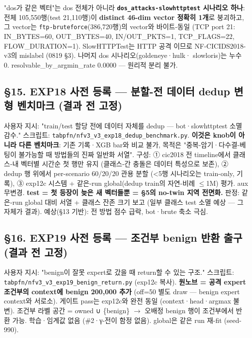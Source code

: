 "dos가 같은 벡터"는 dos 전체가 아니라 \textbf{\texttt{dos\_\allowbreak{}\allowbreak{}atta\allowbreak{}cks-\allowbreak{}slow\allowbreak{}httptest\allowbreak{}} 시나리오 하나}: 전체 105,550행(test 21,110행)이 \textbf{distinct 46-dim vector 정확히 1개}로 붕괴하고, 그 vector는 \texttt{ftp-\allowbreak{}brut\allowbreak{}eforce}(386,720행)의 vector와 바이트-동일 (TCP port 21: IN\_\allowbreak{}BYTES=\allowbreak{}60, OUT\_\allowbreak{}BYTES=\allowbreak{}40, IN/\allowbreak{}OUT\_\allowbreak{}PKTS=\allowbreak{}1, TCP\_\allowbreak{}FLAGS=\allowbreak{}22, FLOW\_\allowbreak{}DURATION=\allowbreak{}1). SlowHTTPTest는 HTTP 공격 이므로 NF-CICIDS2018-v3의 mislabel (0819 §3). 나머지 dos 시나리오(goldeneye·hulk· slowloris)는 누수 0. resolvable\_\allowbreak{}by\_\allowbreak{}argmin\_\allowbreak{}rate 0.0000 — 원리적 분리 불가.

\subsection{§15. EXP18 사전 등록 — 분할-전 데이터 dedup 변형 벤치마크 (결과 전 고정)}
사용자 지시: "train/\allowbreak{}test 할당 전에 데이터 자체를 dedup — bot·slowhttptest 소멸 감수." 스크립트: \texttt{tabpfn/\allowbreak{}\allowbreak{}n\allowbreak{}fv3\_\allowbreak{}\allowbreak{}v3\_\allowbreak{}\allowbreak{}e\allowbreak{}xp18\_\allowbreak{}\allowbreak{}ded\allowbreak{}up\_\allowbreak{}\allowbreak{}bench\allowbreak{}mark.\allowbreak{}py}. \textbf{이것은 knob이 아니라 다른 벤치마크}: 기존 기록·XGB bar와 비교 불가, 목적은 "중복-암기·다수결-베팅이 불가능할 때 방법들의 진짜 일반화 서열". 구성: ① cic2018 전 timeline에서 클래스-내 벡터별 시간순 첫 행만 유지 (클래스-간 충돌은 데이터 특성으로 보존), ② dedup 행 위에서 per-scenario 60/\allowbreak{}20/\allowbreak{}20 관용 분할 (<5행 시나리오는 train-only, 기록), ③ exp12c 시스템 +\allowbreak{} 같은-run global(dedup train의 자연-비례 \ensuremath{\leq}1M) 평가. aux 무변경. \textbf{test =\allowbreak{} 첫 등장이 늦은 새 벡터들뿐 =\allowbreak{} §5의 no-twin 지역 전면화.} 판정: 같은-run global 대비 서열 +\allowbreak{} 클래스 잔존 크기 보고 (일부 클래스 test 소멸 예상 — 그 자체가 결과). 예상(§13 기반): 전 방법 점수 급락, bot·brute 축소 극심.

\subsection{§16. EXP19 사전 등록 — 조건부 benign 반환 출구 (결과 전 고정)}
사용자 지시: "benign이 잘못 expert로 갔을 때 return할 수 있는 구조." 스크립트: \texttt{tabpfn/\allowbreak{}\allowbreak{}n\allowbreak{}fv3\_\allowbreak{}\allowbreak{}v3\_\allowbreak{}\allowbreak{}e\allowbreak{}xp19\_\allowbreak{}\allowbreak{}ben\allowbreak{}ign\_\allowbreak{}\allowbreak{}retu\allowbreak{}rn.\allowbreak{}py} (exp12c 복사). \textbf{원노브 =\allowbreak{} 공격 expert 조건부의 context에 benign 200,000 추가} (off=\allowbreak{}50 별도 draw — benign expert context와 서로소). 게이트 pass는 exp12c와 완전 동일 (context·head·argmax 불변). 조건부 라벨 공간 =\allowbreak{} owned ∪ \{benign\}  \ensuremath{\rightarrow}  오배정 benign 행이 조건부에서 반환 가능. 학습·임계값 없음 (\#2·γ-전이 함정 없음). global은 같은 run 재-fit (seed-990).

